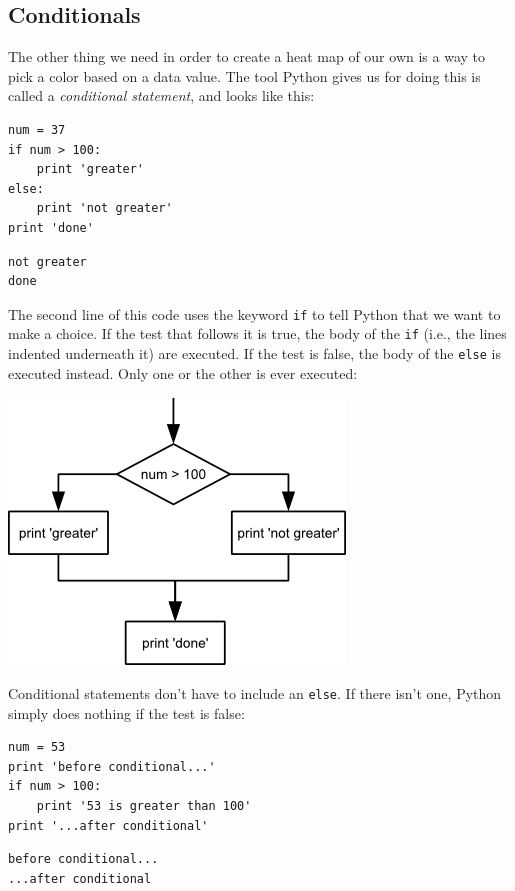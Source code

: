 \documentclass[]{book}
\newcommand{\gdef}[2]{\emph{#2}}
\begin{document}
\subsection{Conditionals}

The other thing we need in order to create a heat map of our own is a
way to pick a color based on a data value. The tool Python gives us for
doing this is called a \gdef{g:conditional-statement}{conditional
statement}, and looks like this:

\begin{verbatim}
num = 37
if num > 100:
    print 'greater'
else:
    print 'not greater'
print 'done'
\end{verbatim}

\begin{verbatim}
not greater
done
\end{verbatim}

The second line of this code uses the keyword \texttt{if} to tell Python
that we want to make a choice. If the test that follows it is true, the
body of the \texttt{if} (i.e., the lines indented underneath it) are
executed. If the test is false, the body of the \texttt{else} is
executed instead. Only one or the other is ever executed:

\includegraphics{novice/python/img/python-flowchart-conditional.png}

Conditional statements don't have to include an \texttt{else}. If there
isn't one, Python simply does nothing if the test is false:

\begin{verbatim}
num = 53
print 'before conditional...'
if num > 100:
    print '53 is greater than 100'
print '...after conditional'
\end{verbatim}

\begin{verbatim}
before conditional...
...after conditional
\end{verbatim}
\end{document}
